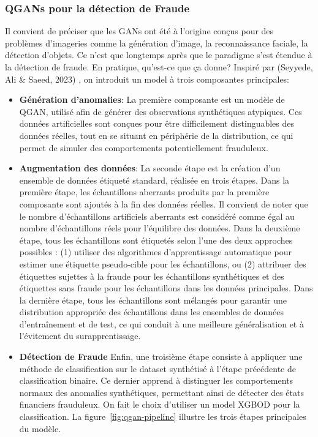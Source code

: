 \documentclass[a4paper]{article}
\begin{document}
\subsubsection{QGANs pour la détection de Fraude}

Il convient de préciser que les GANs ont été à l'origine conçus pour des problèmes d'imageries comme la génération d'image, la reconnaissance faciale, la détection d'objets. Ce n'est que longtemps après que le paradigme s'est étendue à la détection de fraude. En pratique, qu'est-ce que ça donne? Inspiré par (Seyyede, Ali \& Saeed, 2023) \cite{GANs}, on introduit un model à trois composantes principales: 

\begin{itemize}
    \item{\textbf{Génération d'anomalies}}: La première composante est un modèle de QGAN, utilisé afin de générer des observations synthétiques atypiques. Ces données artificielles sont conçues pour être difficilement distinguables des données réelles, tout en se situant en périphérie de la distribution, ce qui permet de simuler des comportements potentiellement frauduleux.

    \item{\textbf{Augmentation des données}}: La seconde étape est la création d'un ensemble de données étiqueté standard, réalisée en trois étapes. Dans la première étape, les échantillons aberrants produits par la première composante sont ajoutés à la fin des données réelles. Il convient de noter que le nombre d'échantillons artificiels aberrants est considéré comme égal au nombre d'échantillons réels pour l'équilibre des données. Dans la deuxième étape, tous les échantillons sont étiquetés selon l'une des deux approches possibles : (1) utiliser des algorithmes d'apprentissage automatique pour estimer une étiquette pseudo-cible pour les échantillons, ou (2) attribuer des étiquettes sujettes à la fraude pour les échantillons synthétiques et des étiquettes sans fraude pour les échantillons dans les données principales. Dans la dernière étape, tous les échantillons sont mélangés pour garantir une distribution appropriée des échantillons dans les ensembles de données d'entraînement et de test, ce qui conduit à une meilleure généralisation et à l'évitement du surapprentissage.

    \item{\textbf{Détection de Fraude}} Enfin, une troisième étape consiste à appliquer une méthode de classification sur le dataset synthétisé à l'étape précédente de classification binaire. Ce dernier apprend à distinguer les comportements normaux des anomalies synthétiques, permettant ainsi de détecter des états financiers frauduleux. On fait le choix d'utiliser un model XGBOD pour la classification.
    La figure~\ref{fig:qgan-pipeline} illustre les trois étapes principales du modèle. 
    
\end{itemize}
\end{document}
